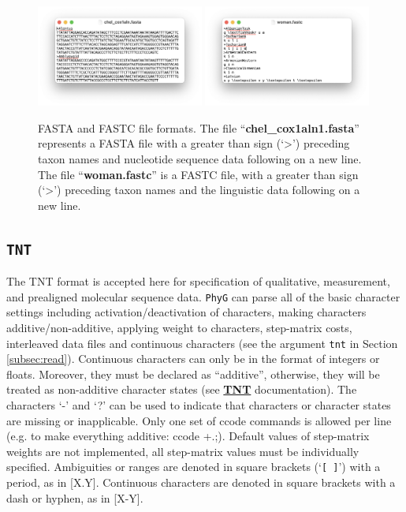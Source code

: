 \documentclass[11pt]{book}
\newcommand{\phyg}{\texttt{PhyG} }
\begin{document}
{{		\begin{figure}[H]
		\centering
		\includegraphics[width=0.49\textwidth]{fasta.png}
		\includegraphics[width=0.49\textwidth]{fastc.png}
		\caption{FASTA and FASTC file formats. The file ``\textbf{chel\_cox1aln1.fasta}'' 
		represents a FASTA file with a greater than sign (`>') preceding taxon names and nucleotide  
		sequence data following on a new line. The file ``\textbf{woman.fastc}'' is a FASTC 
		file, with a greater than sign (`>') preceding taxon names and the linguistic data following 
		on a new line.}
		\label{fasta-c}
		\end{figure}
		
	\subsection{\texttt{TNT}}
	\label{subsec:TNT}
		The TNT \citep{Goloboffetal2008} format is accepted here for specification of 
		qualitative, measurement, and prealigned molecular sequence data. \phyg can 
		parse all of the basic character settings including activation/deactivation of 
		characters, making characters additive/non-additive, applying weight to characters, 
		step-matrix costs, interleaved data files and continuous characters (see the 
		argument \texttt{tnt} in Section \ref{subsec:read}). Continuous characters can only be 
		in the format of integers or floats. Moreover, they must be declared as ``additive'', 
		otherwise, they will be treated as non-additive character states (see 
		\href{http://phylo.wikidot.com/tnt-htm}{\textbf{TNT}} documentation).
		The characters `-' and `?' can be used to indicate that characters or character 
		states are missing or inapplicable. Only one set of ccode commands is allowed 
		per line (e.g. to make everything additive: ccode +.;). Default values of step-matrix 
		weights are not implemented, all step-matrix values must be individually specified. 
		Ambiguities or ranges are denoted in square brackets (`\texttt{[ ]}') with a period, 
		as in [X.Y]. Continuous characters are denoted in square brackets with a dash or 
		hyphen, as in [X-Y].

}}
\end{document}
